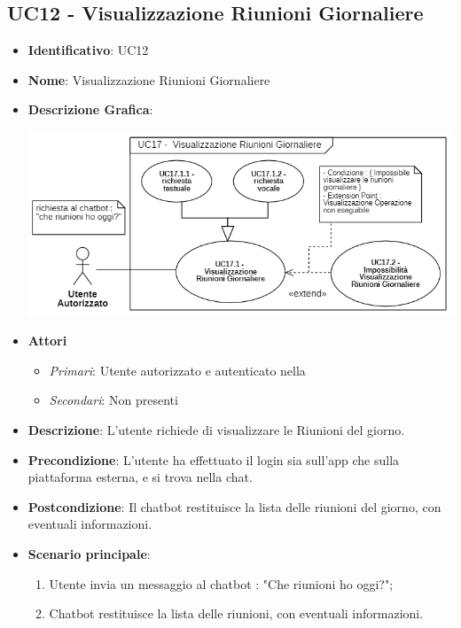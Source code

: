\subsection{UC12 - Visualizzazione Riunioni Giornaliere }
\begin{itemize}
	\item \textbf{Identificativo}: UC12
	\item \textbf{Nome}: Visualizzazione Riunioni Giornaliere
	\item\textbf{Descrizione Grafica}: 
	\begin{center}
		\includegraphics[scale=0.65]{images/UC12.png} 
	\end{center}

	\item \textbf{Attori}
	\begin{itemize} 
		\item \textit{Primari}: Utente autorizzato e autenticato nella 
		\item \textit{Secondari}: Non presenti
	\end{itemize}
	\item \textbf{Descrizione}: L'utente richiede di visualizzare le Riunioni del giorno.
	\item \textbf{Precondizione}: L'utente ha effettuato il login sia sull'app che sulla piattaforma esterna, e si trova nella chat.
	\item \textbf{Postcondizione}: Il chatbot restituisce la lista delle riunioni del giorno, con eventuali informazioni.
	\item \textbf{Scenario principale}:  \begin{enumerate}
		\item Utente invia un messaggio al chatbot : "Che riunioni ho oggi?";
		\item Chatbot restituisce la lista delle riunioni, con eventuali informazioni.
	\end{enumerate}
\end{itemize}

